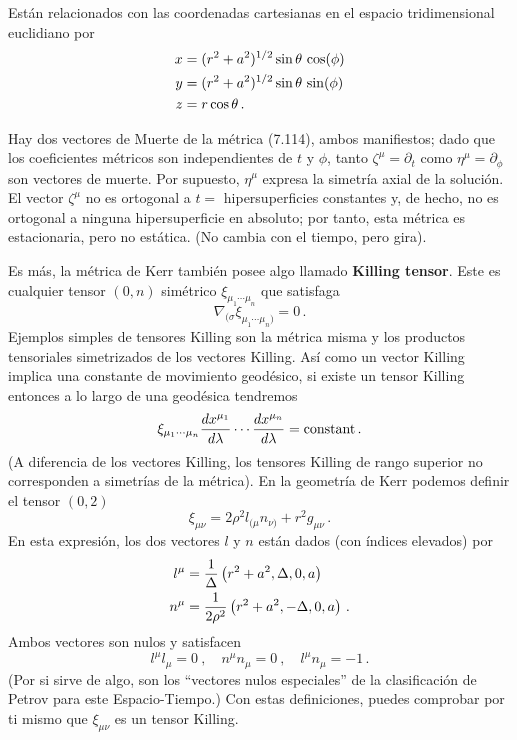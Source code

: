 \documentclass[11pt,b5paper,openany,twoside]{book}
\newcommand{\mn}{{\mu\nu}}
\newcommand{\p}[1]{{\partial_{#1}}}
\begin{document}
\noindent
Están relacionados con las coordenadas cartesianas en el espacio tridimensional euclidiano por
\begin{align}
x &=  (r^2+a^2)^{1/2}\sin\theta\,\cos(\phi) \notag \\
y &=  (r^2+a^2)^{1/2}\sin\theta\,\sin(\phi) \notag \\
z &=  r\cos\theta\,.\label{7.118}
\end{align}

Hay dos vectores de Muerte de la métrica (7.114), ambos manifiestos; dado que los coeficientes métricos son independientes de $t$ y $\phi$, tanto $\zeta^\mu=\p{t}$ como $\eta^\mu=\p\phi$ son vectores de muerte.
Por supuesto, $\eta^\mu$ expresa la simetría axial de la solución.
El vector $\zeta^\mu$ no es ortogonal a $t=$ hipersuperficies constantes y, de hecho, no es ortogonal a ninguna hipersuperficie en absoluto; por tanto, esta métrica es estacionaria, pero no estática.
(No cambia con el tiempo, pero gira).

Es más, la métrica de Kerr también posee algo llamado {\bf Killing tensor}.
Este es cualquier tensor $(0,n)$ simétrico $\xi_{\mu_1\cdots\mu_n}$ que satisfaga
\begin{equation}
\nabla_{(\sigma}\xi_{\mu_1\cdots\mu_n)}=0\,.\label{7.119}
\end{equation}
Ejemplos simples de tensores Killing son la métrica misma y los productos tensoriales simetrizados de los vectores Killing.
Así como un vector Killing implica una constante de movimiento geodésico, si existe un tensor Killing entonces a lo largo de una geodésica tendremos
\begin{equation}
\xi_{\mu_1\cdots\mu_n}{{dx^{\mu_1}}\over{d\lambda}}\cdots
{{dx^{\mu_n}}\over{d\lambda}} = {\rm constant}\,.\label{7.120}
\end{equation}
(A diferencia de los vectores Killing, los tensores Killing de rango superior no corresponden a simetrías de la métrica).
En la geometría de Kerr podemos definir el tensor $(0,2)$
\begin{equation}
\xi_\mn = 2\rho^2 l_{(\mu}n_{\nu)} + r^2 g_\mn\,.\label{7.121}
\end{equation}
En esta expresión, los dos vectores $l$ y $n$ están dados (con índices elevados) por
\begin{align}
l^\mu  &=  {1\over\Delta}\left(r^2+a^2, \Delta, 0, a\right) \notag \\
n^\mu  &=  {1\over{2\rho^2}}\left(r^2+a^2, -\Delta, 0, a\right)\,.
\label{7.122}
\end{align}
Ambos vectores son nulos y satisfacen
\begin{equation}
l^\mu l_\mu =0\ ,\quad n^\mu n_\mu =0\ ,\quad l^\mu n_\mu =-1\,.
\label{7.123}
\end{equation}
(Por si sirve de algo, son los ``vectores nulos especiales'' de la clasificación de Petrov para este Espacio-Tiempo.)
Con estas definiciones, puedes comprobar por ti mismo que $\xi_\mn$ es un tensor Killing.
\end{document}
